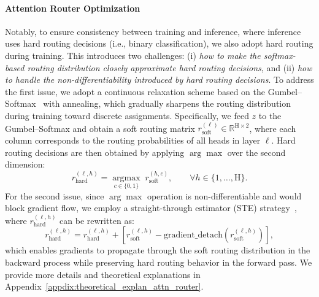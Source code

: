 \paragraph{Attention Router Optimization}
Notably, to ensure consistency between training and inference, where inference uses hard routing decisions (i.e., binary classification), we also adopt hard routing during training. 
This introduces two challenges:
(i) \emph{how to make the softmax-based routing distribution closely approximate hard routing decisions}, and
(ii) \emph{how to handle the non-differentiability introduced by hard routing decisions}.
To address the first issue, we adopt a continuous relaxation scheme based on the Gumbel--Softmax~\citep{jang2016categorical} with annealing, which gradually sharpens the routing distribution during training toward discrete assignments.
Specifically, we feed $z$ to the Gumbel--Softmax and obtain a soft routing matrix $r^{(\ell)}_{\mathrm{soft}} \in \mathbb{R}^\mathrm{{H\times 2}}$, where each column corresponds to the routing probabilities of all heads in layer $\ell$.
Hard routing decisions are then obtained by applying $\arg\max$ over the second dimension:
\begin{equation}
r_{\mathrm{hard}}^{(\ell,h)}
=
\mathop{\mathrm{argmax}}\limits_{c \in \{0,1\}} \; r_{\mathrm{soft}}^{(h,c)}, 
\qquad \forall h \in \{1,\dots,\mathrm{H}\}.
\end{equation}
For the second issue, since $\arg\max$ operation is non-differentiable and would block gradient flow, we employ a straight-through estimator (STE) strategy~\citep{bengio2013estimating}, where $r_{\mathrm{hard}}^{(\ell,h)}$ can be rewritten as:
\begin{equation}
    r_{\mathrm{hard}}^{(\ell,h)} = r_{\mathrm{hard}}^{(\ell,h)} + \left[r_\mathrm{soft}^{(\ell,h)} - \mathrm{gradient\_detach}\left(r_\mathrm{soft}^{(\ell,h)}\right)\right],
\end{equation}
which enables gradients to propagate through the soft routing distribution in the backward process while preserving hard routing behavior in the forward pass.
We provide more details and theoretical explanations in Appendix~\ref{appdix:theoretical_explan_attn_router}.



